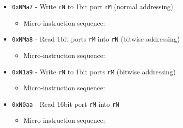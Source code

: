 \documentclass{article}
\def\regtodata#1{\Verb|#1003| - output \Verb|r#1| to data bus}
\def\regtoaddr#1{\Verb|#1103| - output \Verb|r#1| to addr bus}
\def\datatoreg#1{\Verb|#1403| - write to \Verb|r#1| from data bus}
\def\writebitport {\Verb|00a1| - write data line to 1bit port \Verb|addr| (normal addressing)}
\def\readbitportb {\Verb|00a2| - read 1bit port \Verb|addr| (bitwise addressing) to the data line}
\def\writebitportb{\Verb|00a3| - write data line to 1bit port \Verb|addr| (bitwise addressing)}
\def\readwideport {\Verb|00a4| - read 16bit port \Verb|addr| to the data line}
\def\done{\Verb|fffe| - end instruction}
\begin{document}
\begin{itemize}
    \item \Verb|0xNMa7| - Write \Verb|rN| to 1bit port \Verb|rM| (normal addressing)
    \begin{itemize}
        \item Micro-instruction sequence:
    \end{itemize}
    
    \item \Verb|0xNMa8| - Read 1bit ports \Verb|rM| into \Verb|rN| (bitwise addressing)
    \begin{itemize}
        \item Micro-instruction sequence:
    \end{itemize}
    
    \item \Verb|0xN1a9| - Write \Verb|rN| to 1bit ports \Verb|rM| (bitwise addressing)
    \begin{itemize}
        \item Micro-instruction sequence:
    \end{itemize}

    \item \Verb|0xN0aa| - Read 16bit port \Verb|rM| into \Verb|rN|
    \begin{itemize}
        \item Micro-instruction sequence:
    \end{itemize}
    

\end{itemize}
\end{document}
